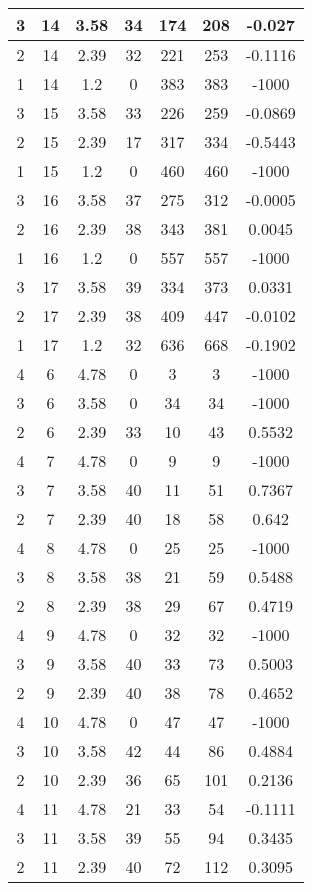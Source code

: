\documentclass[letterpaper, 12pt]{article}
\begin{document}
\begin{longtable}{|c|c|c|c|c|c|c|}
\hline
3 & 14 & 3.58 & 34 & 174 & 208 & -0.027 \\
\hline
2 & 14 & 2.39 & 32 & 221 & 253 & -0.1116 \\
\hline
1 & 14 & 1.2 & 0 & 383 & 383 & -1000 \\
\hline
3 & 15 & 3.58 & 33 & 226 & 259 & -0.0869 \\
\hline
2 & 15 & 2.39 & 17 & 317 & 334 & -0.5443 \\
\hline
1 & 15 & 1.2 & 0 & 460 & 460 & -1000 \\
\hline
3 & 16 & 3.58 & 37 & 275 & 312 & -0.0005 \\
\hline
2 & 16 & 2.39 & 38 & 343 & 381 & 0.0045 \\
\hline
1 & 16 & 1.2 & 0 & 557 & 557 & -1000 \\
\hline
3 & 17 & 3.58 & 39 & 334 & 373 & 0.0331 \\
\hline
2 & 17 & 2.39 & 38 & 409 & 447 & -0.0102 \\
\hline
1 & 17 & 1.2 & 32 & 636 & 668 & -0.1902 \\
\hline
4 & 6 & 4.78 & 0 & 3 & 3 & -1000 \\
\hline
3 & 6 & 3.58 & 0 & 34 & 34 & -1000 \\
\hline
2 & 6 & 2.39 & 33 & 10 & 43 & 0.5532 \\
\hline
4 & 7 & 4.78 & 0 & 9 & 9 & -1000 \\
\hline
3 & 7 & 3.58 & 40 & 11 & 51 & 0.7367 \\
\hline
2 & 7 & 2.39 & 40 & 18 & 58 & 0.642 \\
\hline
4 & 8 & 4.78 & 0 & 25 & 25 & -1000 \\
\hline
3 & 8 & 3.58 & 38 & 21 & 59 & 0.5488 \\
\hline
2 & 8 & 2.39 & 38 & 29 & 67 & 0.4719 \\
\hline
4 & 9 & 4.78 & 0 & 32 & 32 & -1000 \\
\hline
3 & 9 & 3.58 & 40 & 33 & 73 & 0.5003 \\
\hline
2 & 9 & 2.39 & 40 & 38 & 78 & 0.4652 \\
\hline
4 & 10 & 4.78 & 0 & 47 & 47 & -1000 \\
\hline
3 & 10 & 3.58 & 42 & 44 & 86 & 0.4884 \\
\hline
2 & 10 & 2.39 & 36 & 65 & 101 & 0.2136 \\
\hline
4 & 11 & 4.78 & 21 & 33 & 54 & -0.1111 \\
\hline
3 & 11 & 3.58 & 39 & 55 & 94 & 0.3435 \\
\hline
2 & 11 & 2.39 & 40 & 72 & 112 & 0.3095 \\

\end{longtable}
\end{document}
